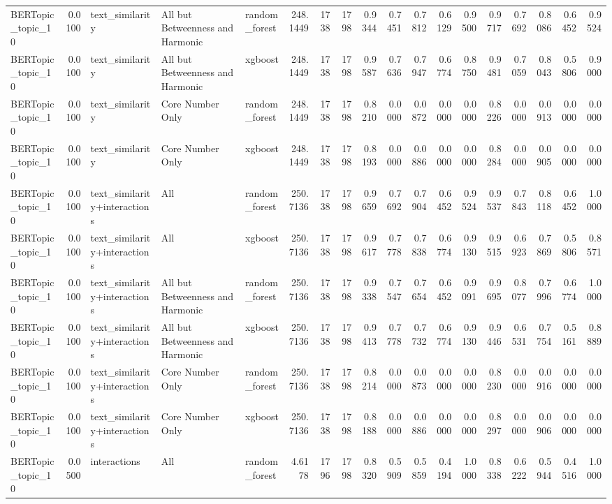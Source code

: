 \begin{tabular}{lrlllrrrrrrrrrrrrr}
BERTopic_topic_10 & 0.0100 & text_similarity & All but Betweenness and Harmonic & random_forest & 248.1449 & 1738 & 1798 & 0.9344 & 0.7451 & 0.7812 & 0.6129 & 0.9500 & 0.9717 & 0.7692 & 0.8086 & 0.6452 & 0.9524 \\
BERTopic_topic_10 & 0.0100 & text_similarity & All but Betweenness and Harmonic & xgboost & 248.1449 & 1738 & 1798 & 0.9587 & 0.7636 & 0.7947 & 0.6774 & 0.8750 & 0.9481 & 0.7059 & 0.8043 & 0.5806 & 0.9000 \\
BERTopic_topic_10 & 0.0100 & text_similarity & Core Number Only & random_forest & 248.1449 & 1738 & 1798 & 0.8210 & 0.0000 & 0.0872 & 0.0000 & 0.0000 & 0.8226 & 0.0000 & 0.0913 & 0.0000 & 0.0000 \\
BERTopic_topic_10 & 0.0100 & text_similarity & Core Number Only & xgboost & 248.1449 & 1738 & 1798 & 0.8193 & 0.0000 & 0.0886 & 0.0000 & 0.0000 & 0.8284 & 0.0000 & 0.0905 & 0.0000 & 0.0000 \\
BERTopic_topic_10 & 0.0100 & text_similarity+interactions & All & random_forest & 250.7136 & 1738 & 1798 & 0.9659 & 0.7692 & 0.7904 & 0.6452 & 0.9524 & 0.9537 & 0.7843 & 0.8118 & 0.6452 & 1.0000 \\
BERTopic_topic_10 & 0.0100 & text_similarity+interactions & All & xgboost & 250.7136 & 1738 & 1798 & 0.9617 & 0.7778 & 0.7838 & 0.6774 & 0.9130 & 0.9515 & 0.6923 & 0.7869 & 0.5806 & 0.8571 \\
BERTopic_topic_10 & 0.0100 & text_similarity+interactions & All but Betweenness and Harmonic & random_forest & 250.7136 & 1738 & 1798 & 0.9338 & 0.7547 & 0.7654 & 0.6452 & 0.9091 & 0.9695 & 0.8077 & 0.7996 & 0.6774 & 1.0000 \\
BERTopic_topic_10 & 0.0100 & text_similarity+interactions & All but Betweenness and Harmonic & xgboost & 250.7136 & 1738 & 1798 & 0.9413 & 0.7778 & 0.7732 & 0.6774 & 0.9130 & 0.9446 & 0.6531 & 0.7754 & 0.5161 & 0.8889 \\
BERTopic_topic_10 & 0.0100 & text_similarity+interactions & Core Number Only & random_forest & 250.7136 & 1738 & 1798 & 0.8214 & 0.0000 & 0.0873 & 0.0000 & 0.0000 & 0.8230 & 0.0000 & 0.0916 & 0.0000 & 0.0000 \\
BERTopic_topic_10 & 0.0100 & text_similarity+interactions & Core Number Only & xgboost & 250.7136 & 1738 & 1798 & 0.8188 & 0.0000 & 0.0886 & 0.0000 & 0.0000 & 0.8297 & 0.0000 & 0.0906 & 0.0000 & 0.0000 \\
BERTopic_topic_10 & 0.0500 & interactions & All & random_forest & 4.6178 & 1796 & 1798 & 0.8320 & 0.5909 & 0.5859 & 0.4194 & 1.0000 & 0.8338 & 0.6222 & 0.5944 & 0.4516 & 1.0000 \\

\end{tabular}
